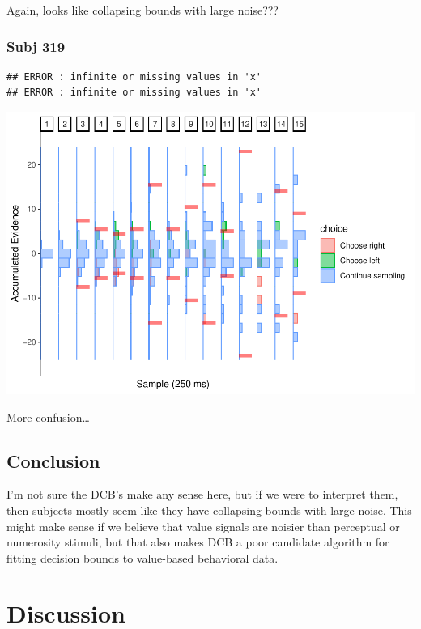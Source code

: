 \documentclass[
]{book}
\begin{document}
Again, looks like collapsing bounds with large noise???

\hypertarget{subj-319-1}{%
\subsubsection*{Subj 319}\label{subj-319-1}}

\begin{verbatim}
## ERROR : infinite or missing values in 'x' 
## ERROR : infinite or missing values in 'x'
\end{verbatim}

\includegraphics{LateNightBayes_files/figure-latex/unnamed-chunk-38-1.pdf}

More confusion\ldots{}

\hypertarget{conclusion-4}{%
\subsection{Conclusion}\label{conclusion-4}}

I'm not sure the DCB's make any sense here, but if we were to interpret them, then subjects mostly seem like they have collapsing bounds with large noise. This might make sense if we believe that value signals are noisier than perceptual or numerosity stimuli, but that also makes DCB a poor candidate algorithm for fitting decision bounds to value-based behavioral data.

\hypertarget{discussion}{%
\section{Discussion}\label{discussion}}
\end{document}
